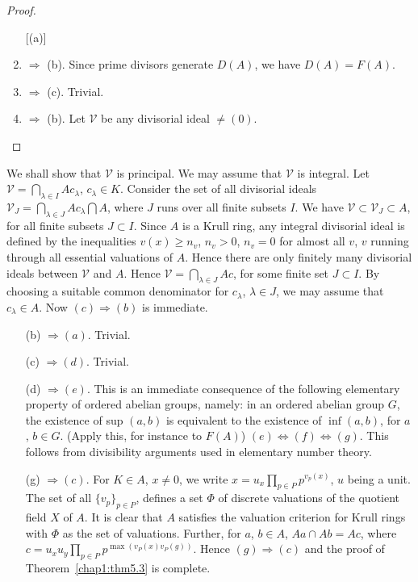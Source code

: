 \begin{proof} 
\begin{enumerate} [(a)]
\item $\Rightarrow$ (b). Since prime divisors generate $D(A)$, we have
  $D(A) = F(A)$. 

\item $\Rightarrow$ (c). Trivial.

\item $\Rightarrow$ (b). Let $\mathscr{V}$ be any divisorial ideal
  $\neq (0)$. 
\end{enumerate}
 \end{proof} 
 
 \noindent
 We shall show that $\mathscr{V}$ is principal. We may assume that
 $\mathscr{V}$ is integral. Let $\mathscr{V} = \bigcap\limits_{\lambda
   \in I} A c_\lambda$, $c_ \lambda \in K$. Consider the set of all
 divisorial ideals\pageoriginale $\mathscr{V}_J =
 \bigcap\limits_{\lambda \in J} A 
 c_ \lambda \bigcap A$, where $J$ runs over all finite subsets $I$. We
 have $\mathscr{V} \subset \mathscr{V}_J \subset A$, for all finite
 subsets $J \subset I$. Since $A$ is a Krull ring, any integral
 divisorial ideal is defined by the inequalities $v(x) \ge n_v$, $n_v >
 0$, $n_v = 0$ for almost all $v$, $v$ running through all essential
 valuations of $A$. Hence there are only finitely many divisorial
 ideals between $\mathscr{V}$ and $A$. Hence $\mathscr{V} =
 \bigcap_{\lambda \in J} A c$, for some finite set $J
 \subset I$. By choosing a suitable common denominator for
 $c_\lambda$, $\lambda \in J$, we may assume that $c_\lambda \in
 A$. Now $(c) \Rightarrow (b)$  is immediate.  
 \begin{enumerate}
\item [(b)] $\Rightarrow (a)$. Trivial. 

\item [(c)] $\Rightarrow (d)$. Trivial.

\item [(d)] $\Rightarrow (e)$. This is an immediate consequence of the
  following elementary property of ordered abelian groups, namely: in
  an ordered abelian group $G$, the existence of sup $(a, b)$ is
  equivalent to the existence of $\inf (a, b)$, for $a$, $b \in
  G$. (Apply this, for instance to $F(A)$) $(e) \Leftrightarrow (f)
  \Leftrightarrow (g)$. This follows from divisibility arguments used
  in elementary number theory. 

\item [(g)] $\Rightarrow (c)$. For $K \in A$, $x \neq 0$, we write $x =
  u_x \prod\limits_{p \in P} p ^{v_p(x)}$, $u$ being a unit. The set of
  all $ \{ v_p \} _{p \in P}$, defines a set $\Phi$ of discrete
  valuations of the quotient field $X$ of  $A$. It is clear that $A$
  satisfies the valuation criterion for Krull rings with $\Phi$ as
  the set of valuations. Further, for $a$, $b \in A$, $A a \cap Ab = Ac$,
  where $c = u_x u_y \prod\limits_{p \in P} p^{\max (v_P (x) v_P
    (g))}$. Hence $(g) \Rightarrow (c)$ and the proof of 
Theorem~\ref{chap1:thm5.3} is complete.  
 \end{enumerate} 
 
